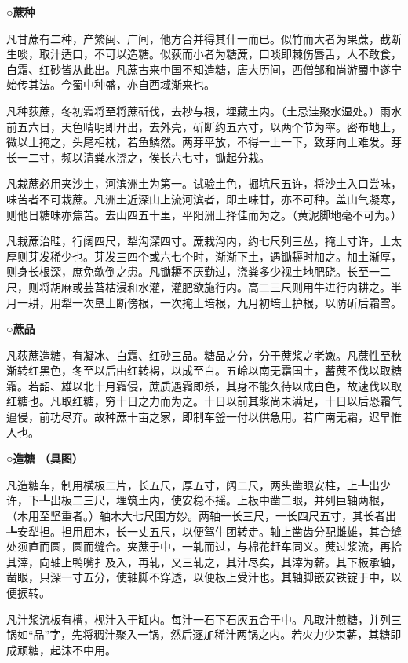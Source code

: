 \documentclass[]{article}
\begin{document}
\textbf{○蔗种}

凡甘蔗有二种，产繁闽、广间，他方合并得其什一而已。似竹而大者为果蔗，截断生啖，取汁适口，不可以造糖。似荻而小者为糖蔗，口啖即棘伤唇舌，人不敢食，白霜、红砂皆从此出。凡蔗古来中国不知造糖，唐大历间，西僧邹和尚游蜀中遂宁始传其法。今蜀中种盛，亦自西域渐来也。

凡种荻蔗，冬初霜将至将蔗斫伐，去杪与根，埋藏土内。（土忌洼聚水湿处。）雨水前五六日，天色晴明即开出，去外壳，斫断约五六寸，以两个节为率。密布地上，微以土掩之，头尾相枕，若鱼鳞然。两芽平放，不得一上一下，致芽向土难发。芽长一二寸，频以清粪水浇之，俟长六七寸，锄起分栽。

凡栽蔗必用夹沙土，河滨洲土为第一。试验土色，掘坑尺五许，将沙土入口尝味，味苦者不可栽蔗。凡洲土近深山上流河滨者，即土味甘，亦不可种。盖山气凝寒，则他日糖味亦焦苦。去山四五十里，平阳洲土择佳而为之。（黄泥脚地毫不可为。）

凡栽蔗治畦，行阔四尺，犁沟深四寸。蔗栽沟内，约七尺列三丛，掩土寸许，土太厚则芽发稀少也。芽发三四个或六七个时，渐渐下土，遇锄耨时加之。加土渐厚，则身长根深，庶免欹倒之患。凡锄耨不厌勤过，浇粪多少视土地肥硗。长至一二尺，则将胡麻或芸苔枯浸和水灌，灌肥欲施行内。高二三尺则用牛进行内耕之。半月一耕，用犁一次垦土断傍根，一次掩土培根，九月初培土护根，以防斫后霜雪。

\textbf{○蔗品}

凡荻蔗造糖，有凝冰、白霜、红砂三品。糖品之分，分于蔗浆之老嫩。凡蔗性至秋渐转红黑色，冬至以后由红转褐，以成至白。五岭以南无霜国土，蓄蔗不伐以取糖霜。若韶、雄以北十月霜侵，蔗质遇霜即杀，其身不能久待以成白色，故速伐以取红糖也。凡取红糖，穷十日之力而为之。十日以前其浆尚未满足，十日以后恐霜气逼侵，前功尽弃。故种蔗十亩之家，即制车釜一付以供急用。若广南无霜，迟早惟人也。

\textbf{○造糖 （具图）}

凡造糖车，制用横板二片，长五尺，厚五寸，阔二尺，两头凿眼安柱，上┺出少许，下┺出板二三尺，埋筑土内，使安稳不摇。上板中凿二眼，并列巨轴两根，（木用至坚重者。）轴木大七尺围方妙。两轴一长三尺，一长四尺五寸，其长者出┺安犁担。担用屈木，长一丈五尺，以便驾牛团转走。轴上凿齿分配雌雄，其合缝处须直而圆，圆而缝合。夹蔗于中，一轧而过，与棉花赶车同义。蔗过浆流，再拾其滓，向轴上鸭嘴扌及入，再轧，又三轧之，其汁尽矣，其滓为薪。其下板承轴，凿眼，只深一寸五分，使轴脚不穿透，以便板上受汁也。其轴脚嵌安铁锭于中，以便捩转。

凡汁浆流板有槽，枧汁入于缸内。每汁一石下石灰五合于中。凡取汁煎糖，并列三锅如``品''字，先将稠汁聚入一锅，然后逐加稀汁两锅之内。若火力少束薪，其糖即成顽糖，起沫不中用。
\end{document}
